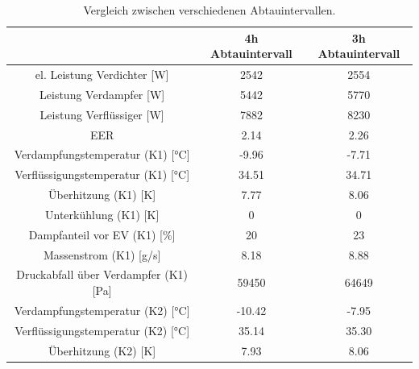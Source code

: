 \begin{table}[h!]
\centering
\caption{Vergleich zwischen verschiedenen Abtauintervallen.}
\label{tab:Vergleich4h3h}
\begin{tabular}{|ccc|}
\hline
                                                                & 4h Abtauintervall           & 3h Abtauintervall \\ \hline
\multicolumn{1}{|c|}{el. Leistung Verdichter {[}W{]}}           & \multicolumn{1}{c|}{2542}   & 2554              \\
\multicolumn{1}{|c|}{Leistung Verdampfer {[}W{]}}               & \multicolumn{1}{c|}{5442}   & 5770              \\
\multicolumn{1}{|c|}{Leistung Verflüssiger {[}W{]}}             & \multicolumn{1}{c|}{7882}   & 8230              \\
\multicolumn{1}{|c|}{EER}                                       & \multicolumn{1}{c|}{2.14}   & 2.26              \\ \hline
\multicolumn{1}{|c|}{Verdampfungstemperatur (K1) {[}°C{]}}      & \multicolumn{1}{c|}{-9.96}  & -7.71             \\
\multicolumn{1}{|c|}{Verflüssigungstemperatur (K1) {[}°C{]}}    & \multicolumn{1}{c|}{34.51}  & 34.71             \\
\multicolumn{1}{|c|}{Überhitzung (K1) {[}K{]}}                  & \multicolumn{1}{c|}{7.77}   & 8.06              \\
\multicolumn{1}{|c|}{Unterkühlung (K1) {[}K{]}}                 & \multicolumn{1}{c|}{0}      & 0                 \\
\multicolumn{1}{|c|}{Dampfanteil vor EV (K1) {[}\%{]}}          & \multicolumn{1}{c|}{20}     & 23                \\
\multicolumn{1}{|c|}{Massenstrom (K1) {[}g/s{]}}                & \multicolumn{1}{c|}{8.18}   & 8.88              \\
\multicolumn{1}{|c|}{Druckabfall über Verdampfer (K1) {[}Pa{]}} & \multicolumn{1}{c|}{59450}  & 64649             \\ \hline
\multicolumn{1}{|c|}{Verdampfungstemperatur (K2) {[}°C{]}}      & \multicolumn{1}{c|}{-10.42} & -7.95             \\
\multicolumn{1}{|c|}{Verflüssigungstemperatur (K2) {[}°C{]}}    & \multicolumn{1}{c|}{35.14}  & 35.30             \\
\multicolumn{1}{|c|}{Überhitzung (K2) {[}K{]}}                  & \multicolumn{1}{c|}{7.93}   & 8.06              \\

\end{tabular}
\end{table}
